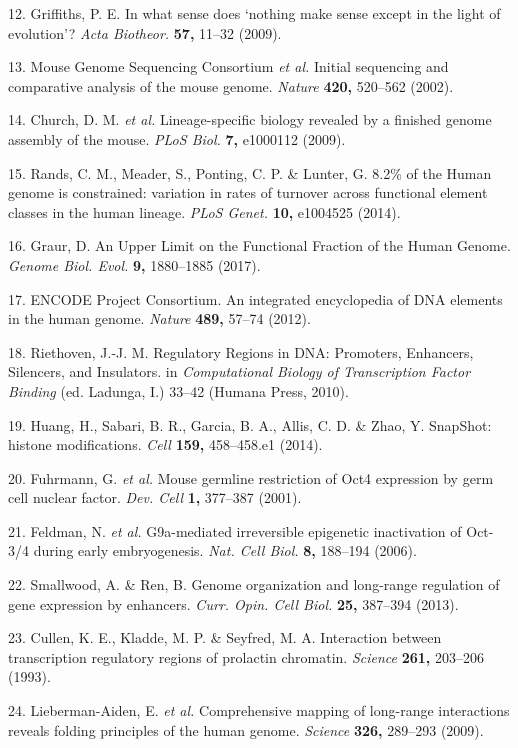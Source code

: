 \documentclass[11pt,twoside]{MPIthesis}
\theoremstyle{definition}
\theoremstyle{definition}
\theoremstyle{definition}
\theoremstyle{remark}
\begin{document}
12. Griffiths, P. E. In what sense does `nothing make sense except in
the light of evolution'? \emph{Acta Biotheor.} \textbf{57,} 11--32
(2009).

13. Mouse Genome Sequencing Consortium \emph{et al.} Initial sequencing
and comparative analysis of the mouse genome. \emph{Nature}
\textbf{420,} 520--562 (2002).

14. Church, D. M. \emph{et al.} Lineage-specific biology revealed by a
finished genome assembly of the mouse. \emph{PLoS Biol.} \textbf{7,}
e1000112 (2009).

15. Rands, C. M., Meader, S., Ponting, C. P. \& Lunter, G. 8.2\% of the
Human genome is constrained: variation in rates of turnover across
functional element classes in the human lineage. \emph{PLoS Genet.}
\textbf{10,} e1004525 (2014).

16. Graur, D. An Upper Limit on the Functional Fraction of the Human
Genome. \emph{Genome Biol. Evol.} \textbf{9,} 1880--1885 (2017).

17. ENCODE Project Consortium. An integrated encyclopedia of DNA
elements in the human genome. \emph{Nature} \textbf{489,} 57--74 (2012).

18. Riethoven, J.-J. M. Regulatory Regions in DNA: Promoters, Enhancers,
Silencers, and Insulators. in \emph{Computational Biology of
Transcription Factor Binding} (ed. Ladunga, I.) 33--42 (Humana Press,
2010).

19. Huang, H., Sabari, B. R., Garcia, B. A., Allis, C. D. \& Zhao, Y.
SnapShot: histone modifications. \emph{Cell} \textbf{159,} 458--458.e1
(2014).

20. Fuhrmann, G. \emph{et al.} Mouse germline restriction of Oct4
expression by germ cell nuclear factor. \emph{Dev. Cell} \textbf{1,}
377--387 (2001).

21. Feldman, N. \emph{et al.} G9a-mediated irreversible epigenetic
inactivation of Oct-3/4 during early embryogenesis. \emph{Nat. Cell
Biol.} \textbf{8,} 188--194 (2006).

22. Smallwood, A. \& Ren, B. Genome organization and long-range
regulation of gene expression by enhancers. \emph{Curr. Opin. Cell
Biol.} \textbf{25,} 387--394 (2013).

23. Cullen, K. E., Kladde, M. P. \& Seyfred, M. A. Interaction between
transcription regulatory regions of prolactin chromatin. \emph{Science}
\textbf{261,} 203--206 (1993).

24. Lieberman-Aiden, E. \emph{et al.} Comprehensive mapping of
long-range interactions reveals folding principles of the human genome.
\emph{Science} \textbf{326,} 289--293 (2009).
\end{document}
